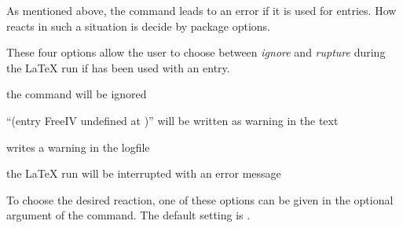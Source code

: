 As mentioned above, the command  leads to an error if it
is used for  entries. How  reacts in
such a situation is decide by package options.

\begin{Declaration}
\end{Declaration}%
These four options allow the user to choose between \emph{ignore} and
\emph{rupture} during the {\LaTeX} run if  has been used
with an  entry.

\begin{labeling}[~--]{}
\item[\Option{adrFreeIVempty}] 
        the command  will be ignored
\item[\Option{adrFreeIVshow}] 
        ``(entry FreeIV undefined at )'' will be
        written as warning in the text
\item[\Option{adrFreeIVwarn}]
        writes a warning in the logfile
\item[\Option{adrFreeIVstop}]
        the {\LaTeX} run will be interrupted with an error message
\end{labeling}
To choose the desired reaction, one of these options can be given in
the optional argument of the  command. The default
setting is .%
%
\EndIndexGroup
%
\EndIndexGroup

\endinput

